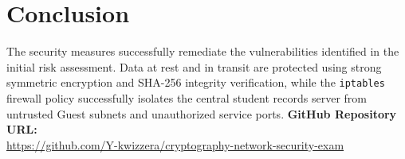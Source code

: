 \documentclass[11pt,a4paper]{article}
\begin{document}
\section{Conclusion}
The security measures successfully remediate the vulnerabilities identified in the initial risk assessment. Data at rest and in transit are protected using strong symmetric encryption and SHA-256 integrity verification, while the \texttt{iptables} firewall policy successfully isolates the central student records server from untrusted Guest subnets and unauthorized service ports.
\vspace{0.5cm}
\noindent\textbf{GitHub Repository URL:} \\
\url{https://github.com/Y-kwizzera/cryptography-network-security-exam}
\end{document}
